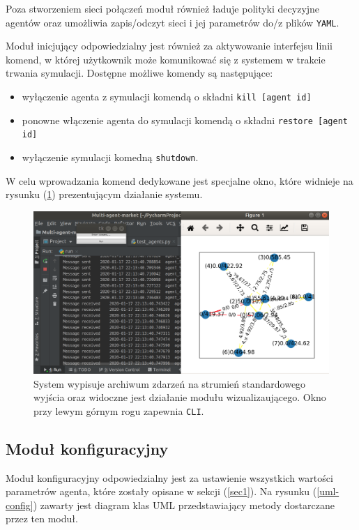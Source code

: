 \documentclass{article}
\begin{document}
Poza stworzeniem sieci połączeń moduł również ładuje polityki decyzyjne agentów oraz umożliwia zapis/odczyt sieci i jej parametrów
do/z plików \texttt{YAML}.


Moduł inicjujący odpowiedzialny jest również za aktywowanie interfejsu linii komend, w której użytkownik może komunikować się z systemem w trakcie trwania symulacji.
Dostępne możliwe komendy są następujące:

\begin{itemize}
	\item wyłączenie agenta z symulacji komendą o składni \texttt{kill [agent id]}
	\item ponowne włączenie agenta do symulacji komendą o składni \texttt{restore [agent id]}
	\item wyłączenie symulacji komedną \texttt{shutdown}.
\end{itemize}

W celu wprowadzania komend dedykowane jest specjalne okno, które widnieje na rysunku (\ref{run-image}) prezentującym działanie systemu.
\begin{figure}[H]
	\centering
	\includegraphics[width=\textwidth, height=0.5\textheight]{./run-image.png}
	\caption{System wypisuje archiwum zdarzeń na strumień standardowego wyjścia oraz widoczne jest działanie modułu wizualizaującego. Okno przy lewym górnym rogu zapewnia \texttt{CLI}.}
	\label{run-image}
\end{figure}


\subsection{Moduł konfiguracyjny}

Moduł konfiguracyjny odpowiedzialny jest za ustawienie wszystkich wartości parametrów agenta, które zostały  
opisane w sekcji (\ref{sec1}).
Na rysunku (\ref{uml-config}) zawarty jest diagram 
klas UML przedstawiający metody dostarczane przez ten moduł.
\end{document}
